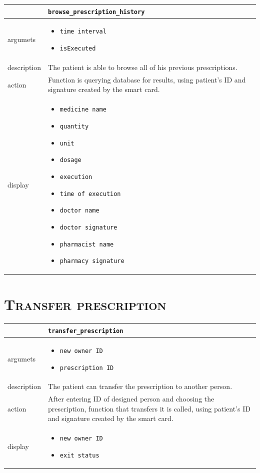 \begin{tabularx}{\textwidth}{ |p{2.5cm}|X| }
	\hline
	 &  \texttt{browse\_prescription\_history}\\
\hline	
argumets & 
\begin{itemize}
\item \texttt{time interval}
\item \texttt{isExecuted}
\end{itemize} \\
\hline
description & The patient is able to browse all of his previous prescriptions.\\
\hline
action & Function is querying database for results, using patient's ID and signature created by the smart card.\\
\hline
display &
\begin{itemize}
\item \texttt{medicine name}
\item \texttt{quantity}
\item \texttt{unit}
\item \texttt{dosage}
\item \texttt{execution}
\item \texttt{time of execution}
\item \texttt{doctor name}
\item \texttt{doctor signature}
\item \texttt{pharmacist name}
\item \texttt{pharmacy signature}
\end{itemize}\\
\hline
\end{tabularx}

\section{\textsc{Transfer prescription}}

\begin{tabularx}{\textwidth}{ |p{2.5cm}|X| }
	\hline
	 &  \texttt{transfer\_prescription}\\
\hline	
argumets & 
\begin{itemize}
\item \texttt{new owner ID}
\item \texttt{prescription ID}
\end{itemize} \\
\hline
description & The patient can transfer the prescription to another person.\\
\hline
action & After entering ID of designed person and choosing the prescription, function that transfers it is called, using patient's ID and signature created by the smart card.\\
\hline
display &
\begin{itemize}
\item \texttt{new owner ID}
\item \texttt{exit status}
\end{itemize}\\
\hline
\end{tabularx}


